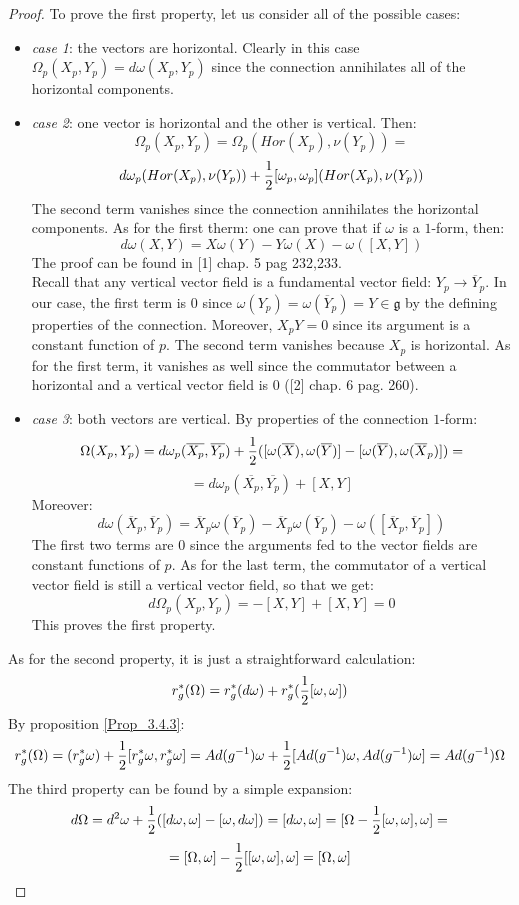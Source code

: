 \documentclass[12pt,a4paper]{report}
\theoremstyle{definition}
\theoremstyle{Theorem}
\theoremstyle{definition}
\theoremstyle{definition}
\begin{document}
	\begin{proof}
		To prove the first property, let us consider all of the possible cases:
		\begin{itemize}
			\item \textit{case 1}: the vectors are horizontal. Clearly in this case $\Omega_p(X_p,Y_p)=d\omega(X_p,Y_p)$ since the connection annihilates all of the horizontal components.
			\item \textit{case 2}: one vector is horizontal and the other is vertical. Then:
			$$\Omega_p(X_p,Y_p)=\Omega_p(Hor(X_p),\nu(Y_p))=$$
			$$d\omega_p(Hor(X_p),\nu(Y_p))+{1\over 2}[\omega_p,\omega_p](Hor(X_p),\nu(Y_p))$$
			The second term vanishes since the connection annihilates the horizontal components. As for the first therm: one can prove that if $\omega$ is a $1$-form, then:
			$$d\omega(X,Y)=X\omega(Y)-Y\omega(X)-\omega([X,Y])$$
			The proof can be found in [1] chap. 5 pag 232,233.\\
			Recall that any vertical vector field is a fundamental vector field: $Y_p\rightarrow \overline{Y}_p$. In our case, the first term is 0 since $\omega(Y_p)=\omega(\overline{Y}_p)=Y\in\mathfrak{g}$ by the defining properties of the connection. Moreover, $X_pY=0$ since its argument is a constant function of $p$. The second term vanishes because $X_p$ is horizontal. As for the first term, it vanishes as well since the commutator between a horizontal and a vertical vector field is 0 ([2] chap. 6 pag. 260).
			\item\textit{case 3}: both vectors are vertical. By properties of the connection $1$-form:
			$$\Omega(X_p,Y_p)=d\omega_p(\overline{X_p},\overline{Y_p})+{1\over 2} ([\omega(\overline{X}),\omega(\overline{Y})]-[\omega(\overline{Y}),\omega(\overline{X}_p)])=$$
			$$=d\omega_p(\overline{X_p},\overline{Y_p})+[X,Y]$$
			Moreover:
			$$d\omega(\overline{X}_p,\overline{Y}_p)=\overline{X}_p\omega(\overline{Y}_p)-\overline{X}_p\omega(\overline{Y}_p)-\omega([\overline{X}_p,\overline{Y}_p])$$	
			The first two terms are 0 since the arguments fed to the vector fields are constant functions of $p$. As for the last term, the commutator of a vertical vector field is still a vertical vector field, so that we get:
			$$d\Omega_p(X_p,Y_p)=-[X,Y]+[X,Y]=0$$
			This proves the first property.
		\end{itemize}
		As for the second property, it is just a straightforward calculation:
		$$r^*_g(\Omega)=r^*_g(d\omega)+r^*_g({1\over 2}[\omega,\omega])$$
		By proposition \ref{Prop_3.4.3}:
		$$r^*_g(\Omega)=(r^*_g\omega)+{1\over 2}[r^*_g\omega,r^*_g\omega]=Ad(g^{-1})\omega+{1\over 2}[Ad(g^{-1})\omega,Ad(g^{-1})\omega]=Ad(g^{-1})\Omega$$
		The third property can be found by a simple expansion:
		$$d\Omega=d^2\omega+{1\over 2}([d\omega,\omega]-[\omega,d\omega])=[d\omega,\omega]=[\Omega-{1\over 2}[\omega,\omega],\omega]=$$
		$$=[\Omega,\omega]-{1\over 2}[[\omega,\omega],\omega]=[\Omega,\omega]$$
	\end{proof}
\end{document}
